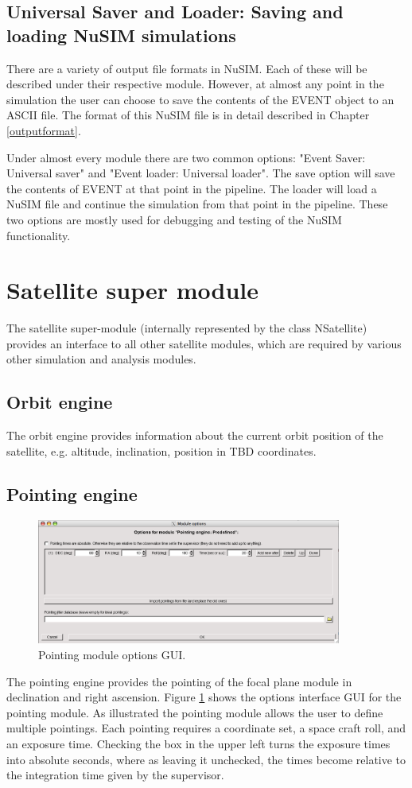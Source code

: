 \subsection{Universal Saver and Loader: Saving and loading NuSIM simulations}
There are a variety of output file formats in NuSIM. Each of these will be described under their respective module. However, at almost any point in the simulation the user can choose to save the contents of the EVENT object to an ASCII file. The format of this NuSIM file is in detail described in Chapter \ref{outputformat}. 

Under almost every module there are two common options: "Event Saver: Universal saver" and "Event loader: Universal loader". The save option will save the contents of EVENT at that point in the pipeline. The loader will load a NuSIM file and continue the simulation from that point in the pipeline. These two options are mostly used for debugging and testing of the NuSIM functionality.

\section{Satellite super module}\label{ssm}
The satellite super-module (internally represented by the class NSatellite) provides an interface to all other satellite modules, which are required by various other simulation and analysis modules.
\subsection{Orbit engine}
The orbit engine provides information about the current orbit position of the satellite, e.g. altitude, inclination, position in TBD coordinates.

\subsection{Pointing engine}
\begin{figure}[bt]
\begin{center}
\includegraphics[width=10cm]{images/pointingGUI.png}  
\caption{Pointing module options GUI.}
\label{pointinggui} 
\end{center}
\end{figure}
The pointing engine provides the pointing of the focal plane module in declination and right ascension. Figure \ref{pointinggui} shows the options interface GUI for the pointing module. As illustrated the pointing module allows the user to define multiple pointings. Each pointing requires a coordinate set, a space craft roll, and an exposure time. Checking the box in the upper left turns the exposure times into absolute seconds, where as leaving it unchecked, the times become relative to the integration time given by the supervisor.

